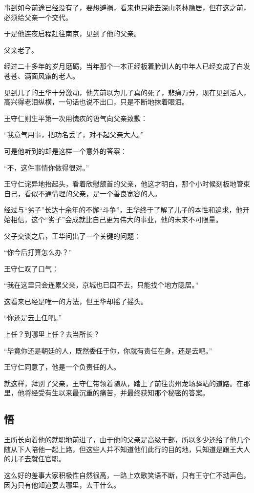 \begin{multicols}{\theparacolNo}
事到如今前途已经没有了，要想避祸，看来也只能去深山老林隐居，但在这之前，必须给父亲一个交代。

于是他连夜启程赶往南京，见到了他的父亲。

父亲老了。

经过二十多年的岁月磨砺，当年那个一本正经板着脸训人的中年人已经变成了白发苍苍、满面风霜的老人。

见到儿子的王华十分激动，他先前以为儿子真的死了，悲痛万分，现在见到活人，高兴得老泪纵横，一句话也说不出口，只是不断地抹着眼泪。

王守仁则生平第一次用愧疚的语气向父亲致歉：

“我意气用事，把功名丢了，对不起父亲大人。”

可是他听到的却是这样一个意外的答案：

“不，这件事情你做得很对。”

王守仁诧异地抬起头，看着欣慰颔首的父亲，他这才明白，那个小时候刻板地管束自己，看似不通情理的父亲，是一个善良宽容的人。

经过与“劣子”长达十余年的不懈“斗争”，王华终于了解了儿子的本性和追求，他开始相信，这个“劣子”会成就比自己更为伟大的事业，他的未来不可限量。

父子交谈之后，王华问出了一个关键的问题：

“你今后打算怎么办？”

王守仁叹了口气：

“我在这里只会连累父亲，京城也已回不去，只能找个地方隐居。”

这看来已经是唯一的方法，但王华却摇了摇头。

“你还是去上任吧。”

上任？到哪里上任？去当所长？

“毕竟你还是朝廷的人，既然委任于你，你就有责任在身，还是去吧。”

王守仁同意了，他是一个负责任的人。

就这样，拜别了父亲，王守仁带领着随从，踏上了前往贵州龙场驿站的道路。在那里，他将经受有生以来最沉重的痛苦，并最终获知那个秘密的答案。

\subsection{悟}
王所长向着他的就职地前进了，由于他的父亲是高级干部，所以多少还给了他几个随从下人陪他一起上路，但这些人并不知道他们此行的目的地，只知道是跟王大人的儿子去就任官职。

这么好的差事大家积极性自然很高，一路上欢歌笑语不断，只有王守仁不动声色，因为只有他知道要去哪里，去干什么。


\end{multicols}
